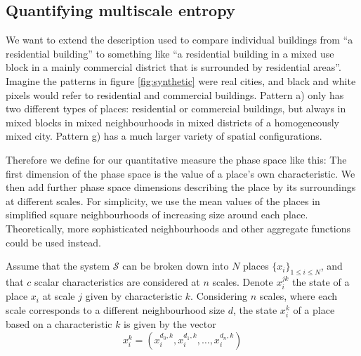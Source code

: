 \documentclass[fleqn,10pt]{wlscirep}
\begin{document}
\subsection*{Quantifying multiscale entropy}

We want to extend the description used to compare individual buildings from ``a residential building'' to something like ``a residential building in a mixed use block in a mainly commercial district that is surrounded by residential areas''. Imagine the patterns in figure \ref{fig:synthetic} were real cities, and black and white pixels would refer to residential and commercial buildings. Pattern a) only has two different types of places: residential or commercial buildings, but always in mixed blocks in mixed neighbourhoods in mixed districts of a homogeneously mixed city. Pattern g) has a much larger variety of spatial configurations.

Therefore we define for our quantitative measure the phase space like this: The first dimension of the phase space is the value of a place's own characteristic. We then add further phase space dimensions describing the place by its surroundings at different scales. For simplicity, we use the mean values of the places in simplified square neighbourhoods of increasing size around each place. Theoretically, more sophisticated neighbourhoods and other aggregate functions could be used instead.







Assume that the system $\mathcal{S}$ can be broken down into $N$ places $\{x_i\}_{1\leq i\leq N}$, and that $c$ scalar characteristics are considered at $n$ scales. Denote $x_i^{jk}$ the state of a place $x_i$ at scale $j$ given by characteristic $k$. Considering $n$ scales, where each scale corresponds to a different neighbourhood size $d$, the state $x_i^{k}$ of a place based on a characteristic $k$ is given by the vector
\begin{equation}
\label{c_state_vector}	
x_i^{k} = (x_i^{d_0,k}, x_i^{d_1,k}, \ldots, x_i^{d_n,k})
\end{equation}
\end{document}
